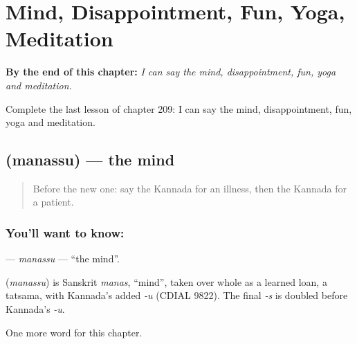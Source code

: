 
\chapter{Mind, Disappointment, Fun, Yoga, Meditation}
\label{ch:ka-mind-disappointment-fun-yoga-meditation}

\begin{chapteropening}
\textbf{By the end of this chapter:} \emph{I can say the mind, disappointment, fun, yoga and meditation.}

Complete the last lesson of chapter 209: I can say the mind, disappointment, fun, yoga and meditation.
\end{chapteropening}

\section[\texorpdfstring{\kn{ಮನಸ್ಸು} (manassu)}{ಮನಸ್ಸು (manassu)}]{ (manassu) — the mind}

\label{lesson:KA-C209-manassu}



\begin{quote}
Before the new one: say the Kannada for an illness, then the Kannada for a patient.
\end{quote}

\subsection*{You'll want to know: }
\textbf{} — \emph{manassu} — \textquotedblleft{}the mind\textquotedblright{}.

\begin{cousinweb}
\textbf{} (\emph{manassu}) is Sanskrit \emph{manas}, \textquotedblleft{}mind\textquotedblright{}, taken over whole as a learned loan, a tatsama, with Kannada's added \emph{-u} (CDIAL 9822). The final \emph{-s} is doubled before Kannada's \emph{-u}.
\end{cousinweb}

\begin{grammarlens}[title={What you've built}]
One more word for this chapter.
\end{grammarlens}

